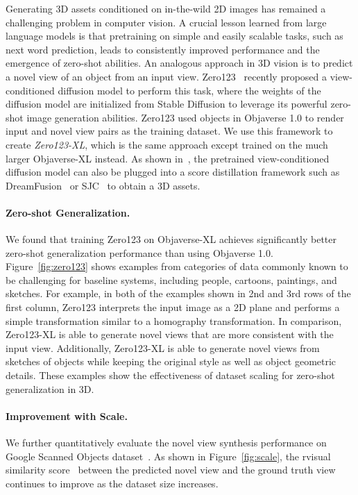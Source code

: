 Generating 3D assets conditioned on in-the-wild 2D images has remained a challenging problem in computer vision. A crucial lesson learned from large language models is that pretraining on simple and easily scalable tasks, such as next word prediction, leads to consistently improved performance and the emergence of zero-shot abilities. An analogous approach in 3D vision is to predict a novel view of an object from an input view. Zero123~\cite{liu2023zero1to3} recently proposed a view-conditioned diffusion model to perform this task, where the weights of the diffusion model are initialized from Stable Diffusion to leverage its powerful zero-shot image generation abilities. Zero123 used objects in Objaverse 1.0 to render input and novel view pairs as the training dataset.
We use this framework to create \textit{Zero123-XL}, which is the same approach except trained on the much larger Objaverse-XL instead. As shown in~\cite{liu2023zero1to3}, the pretrained view-conditioned diffusion model can also be plugged into a score distillation framework such as DreamFusion~\cite{poole2022dreamfusion} or SJC~\cite{wang2023score} to obtain a 3D assets.

\paragraph{Zero-shot Generalization.} We found that training Zero123 on Objaverse-XL achieves significantly better zero-shot generalization performance than using Objaverse 1.0. Figure~\ref{fig:zero123} shows examples from categories of data commonly known to be challenging for baseline systems, including people, cartoons, paintings, and sketches. For example, in both of the examples shown in 2nd and 3rd rows of the first column, Zero123 interprets the input image as a 2D plane and performs a simple transformation similar to a homography transformation. In comparison, Zero123-XL is able to generate novel views that are more consistent with the input view. Additionally, Zero123-XL is able to generate novel views from sketches of objects while keeping the original style as well as object geometric details. These examples show the effectiveness of dataset scaling for zero-shot generalization in 3D.

\paragraph{Improvement with Scale.} We further quantitatively evaluate the novel view synthesis performance on Google Scanned Objects dataset~\cite{downs2022google}. As shown in Figure~\ref{fig:scale}, the rvisual similarity score~\cite{zhang2018unreasonable} between the predicted novel view and the ground truth view continues to improve as the dataset size increases.

